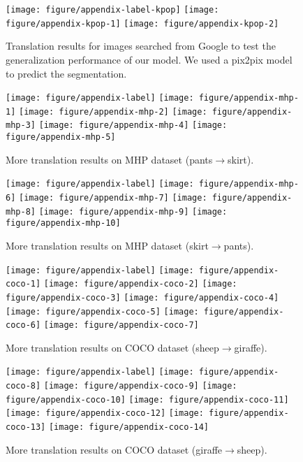 \documentclass{article} \usepackage{iclr2019_conference,times}
\begin{document}
\begin{figure}[H]
	\centering
    \texttt{[image: figure/appendix-label-kpop]}
	\texttt{[image: figure/appendix-kpop-1]}
	\texttt{[image: figure/appendix-kpop-2]}
	\caption{
	Translation results for images searched from Google to test the generalization performance of our model.
	We used a pix2pix \citep{isola2017image} model to predict the segmentation.
	} \label{fig:kpop}
\end{figure}

\begin{figure}[H]
	\centering
	\texttt{[image: figure/appendix-label]}
	\texttt{[image: figure/appendix-mhp-1]}
	\texttt{[image: figure/appendix-mhp-2]}
	\texttt{[image: figure/appendix-mhp-3]}
	\texttt{[image: figure/appendix-mhp-4]}
	\texttt{[image: figure/appendix-mhp-5]}
	\caption{
	More translation results on MHP dataset (pants$\to$skirt).
	} \label{fig:more-mhp-1}
\end{figure}

\begin{figure}[H]
	\centering
	\texttt{[image: figure/appendix-label]}
	\texttt{[image: figure/appendix-mhp-6]}
	\texttt{[image: figure/appendix-mhp-7]}
	\texttt{[image: figure/appendix-mhp-8]}
	\texttt{[image: figure/appendix-mhp-9]}
	\texttt{[image: figure/appendix-mhp-10]}
	\caption{
	More translation results on MHP dataset (skirt$\to$pants).
	} \label{fig:more-mhp-2}
\end{figure}

\begin{figure}[H]
	\centering
	\texttt{[image: figure/appendix-label]}
	\texttt{[image: figure/appendix-coco-1]}
    \texttt{[image: figure/appendix-coco-2]}
    \texttt{[image: figure/appendix-coco-3]}
    \texttt{[image: figure/appendix-coco-4]}
    \texttt{[image: figure/appendix-coco-5]}
    \texttt{[image: figure/appendix-coco-6]}
    \texttt{[image: figure/appendix-coco-7]}
	\caption{
	More translation results on COCO dataset (sheep$\to$giraffe).
	} \label{fig:more-coco-1}
\end{figure}

\begin{figure}[H]
	\centering
	\texttt{[image: figure/appendix-label]}
	\texttt{[image: figure/appendix-coco-8]}
    \texttt{[image: figure/appendix-coco-9]}
    \texttt{[image: figure/appendix-coco-10]}
    \texttt{[image: figure/appendix-coco-11]}
    \texttt{[image: figure/appendix-coco-12]}
    \texttt{[image: figure/appendix-coco-13]}
    \texttt{[image: figure/appendix-coco-14]}
	\caption{
	More translation results on COCO dataset (giraffe$\to$sheep).
	} \label{fig:more-coco-2}
\end{figure}
\end{document}
